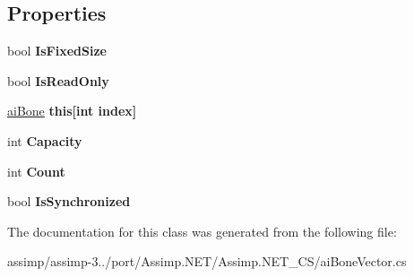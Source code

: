 \subsection*{Properties}
\begin{DoxyCompactItemize}
\item 
\hypertarget{classai_bone_vector_a5433e4f02738bd2d70029e4a784658c0}{bool {\bfseries Is\+Fixed\+Size}}\label{classai_bone_vector_a5433e4f02738bd2d70029e4a784658c0}

\item 
\hypertarget{classai_bone_vector_acfb5dbfa5ca608c6d89d9a5d91428638}{bool {\bfseries Is\+Read\+Only}}\label{classai_bone_vector_acfb5dbfa5ca608c6d89d9a5d91428638}

\item 
\hypertarget{classai_bone_vector_aa188db8c2e7327d06ceb45d68341e083}{\hyperlink{structai_bone}{ai\+Bone} {\bfseries this\mbox{[}int index\mbox{]}}}\label{classai_bone_vector_aa188db8c2e7327d06ceb45d68341e083}

\item 
\hypertarget{classai_bone_vector_a18d55e555fdfbe908791ac5cd8435a84}{int {\bfseries Capacity}}\label{classai_bone_vector_a18d55e555fdfbe908791ac5cd8435a84}

\item 
\hypertarget{classai_bone_vector_a0e776b56786d5f1b9014ef439392941f}{int {\bfseries Count}}\label{classai_bone_vector_a0e776b56786d5f1b9014ef439392941f}

\item 
\hypertarget{classai_bone_vector_a8074bf0d9bb9cf8c021c24f09d090988}{bool {\bfseries Is\+Synchronized}}\label{classai_bone_vector_a8074bf0d9bb9cf8c021c24f09d090988}

\end{DoxyCompactItemize}


The documentation for this class was generated from the following file\+:\begin{DoxyCompactItemize}
\item 
assimp/assimp-\/3../port/\+Assimp.\+N\+E\+T/\+Assimp.\+N\+E\+T\+\_\+\+C\+S/ai\+Bone\+Vector.\+cs\end{DoxyCompactItemize}
